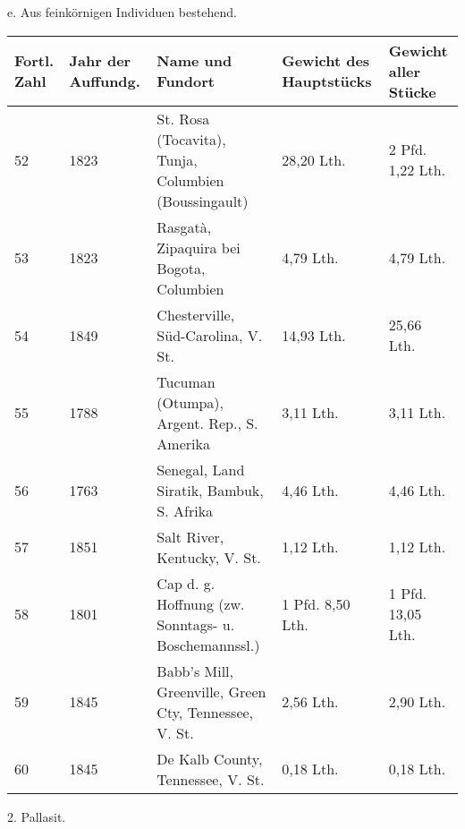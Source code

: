 \documentclass[a4paper, 11pt, oneside]{article}
\begin{document}
\clearpage
\begin{center}
e. Aus feinkörnigen Individuen bestehend.
\end{center}
\begin{center}
\begin{footnotesize}
\begin{tabular}{ |p{7mm}|p{9mm}|p{45mm}|p{24mm}|p{24mm}| }
    \hline
    Fortl. Zahl & Jahr der Auffundg. & Name und Fundort & Gewicht des Hauptstücks & Gewicht aller Stücke\\
    \hline\hline
    52 & 1823 & St. Rosa (Tocavita), Tunja, Columbien (Boussingault) & 28,20 Lth. & 2 Pfd. 1,22 Lth.\\\hline
    53 & 1823 & Rasgatà, Zipaquira bei Bogota, Columbien & 4,79 Lth. & 4,79 Lth.\\\hline
    54 & 1849 & Chesterville, Süd-Carolina, V. St. & 14,93 Lth. & 25,66 Lth.\\\hline
    55 & 1788 & Tucuman (Otumpa), Argent. Rep., S. Amerika & 3,11 Lth. & 3,11 Lth.\\\hline
    56 & 1763 & Senegal, Land Siratik, Bambuk, S. Afrika & 4,46 Lth. & 4,46 Lth.\\\hline
    57 & 1851 & Salt River, Kentucky, V. St. & 1,12 Lth. & 1,12 Lth.\\\hline
    58 & 1801 & Cap d. g. Hoffnung (zw. Sonntags- u. Boschemannssl.) & 1 Pfd. 8,50 Lth. & 1 Pfd. 13,05 Lth.\\\hline
    59 & 1845 & Babb's Mill, Greenville, Green Cty, Tennessee, V. St. & 2,56 Lth. & 2,90 Lth.\\\hline
    60 & 1845 & De Kalb County, Tennessee, V. St. & 0,18 Lth. & 0,18 Lth.\\
    \hline
\end{tabular}
\end{footnotesize}
\end{center}
\clearpage
\begin{center}
2. Pallasit.
\end{center}
\end{document}
